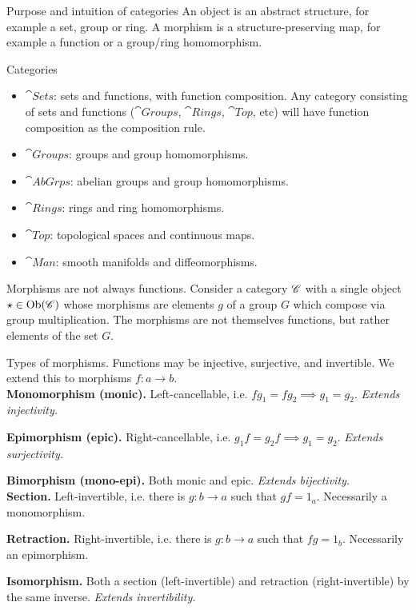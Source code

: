 \begin{keyidea}{Purpose and intuition of categories}
	An object is an abstract structure, for example a set, group or ring. A morphism is a structure-preserving map, for example a function or a group/ring homomorphism.
\end{keyidea}

\begin{examplebox}{Categories}
	\begin{itemize}
		\item $\cat{Sets}$: sets and functions, with function composition. Any category consisting of sets and functions ($\cat{Groups}$, $ \cat{Rings}$, $\cat{Top}$, etc) will have function composition as the composition rule.
		\item $\cat{Groups}$: groups and group homomorphisms.
		\item $\cat{AbGrps}$: abelian groups and group homomorphisms.
		\item $\cat{Rings}$: rings and ring homomorphisms.
		\item $\cat{Top}$: topological spaces and continuous maps.
		\item $\cat{Man}$: smooth manifolds and diffeomorphisms.
	\end{itemize}
\end{examplebox}

\begin{warningbox}{Morphisms are not always functions.}
	Consider a category $\mathscr{C}$ with a single object $\star \in \operatorname{Ob}(\mathscr{C})$ whose morphisms are elements $g$ of a group $G$ which compose via group multiplication. The morphisms are not themselves functions, but rather elements of the set $G$. 
\end{warningbox}

\begin{keyidea}{Types of morphisms.}
	Functions may be injective, surjective, and invertible. We extend this to morphisms $f: a \to b$. \\
	
	\textbf{Monomorphism (monic).} Left-cancellable, i.e. $fg_1 = fg_2 \implies g_1 = g_2$. \textit{Extends injectivity.}
	
	\textbf{Epimorphism (epic).} Right-cancellable, i.e. $g_1 f = g_2 f \implies g_1 = g_2$. \textit{Extends surjectivity.}
	
	\textbf{Bimorphism (mono-epi).} Both monic and epic. \textit{Extends bijectivity.}\\
	
	\textbf{Section.} Left-invertible, i.e. there is $g: b \to a$ such that $gf = 1_a$. Necessarily a monomorphism.
	
	\textbf{Retraction.} Right-invertible, i.e. there is $g: b \to a$ such that $fg = 1_b$. Necessarily an epimorphism.
	
	\textbf{Isomorphism.} Both a section (left-invertible) and retraction (right-invertible) by the same inverse. \textit{Extends invertibility.}
\end{keyidea}

